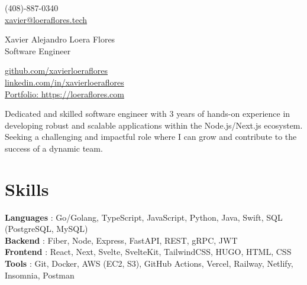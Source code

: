 \documentclass[a4,10pt]{article}
\newcommand{\hskills}[1]{
\textbf{\bfseries #1} }
\begin{document}
\begin{center}
    \begin{minipage}[b]{0.29\textwidth}
            (408)-887-0340 \\
            \href{mailto:xavier@loeraflores.tech}{xavier@loeraflores.tech} 
    \end{minipage}%
    \begin{minipage}[b]{0.4\textwidth}
            \centering
            {\Large Xavier Alejandro Loera Flores} \\ %
            \vspace{0.1cm}
            {\color{UI_blue} \Large{Software Engineer}} \\
    \end{minipage}%
    \begin{minipage}[b]{0.29\textwidth}
            \flushright  %
            {\href{https://github.com/xavierloeraflores}{github.com/xavierloeraflores} } \\
            {\href{https://www.linkedin.com/in/xavierloeraflores}{linkedin.com/in/xavierloeraflores} } \\
            \href{https://loeraflores.com}{Portfolio: https://loeraflores.com}
    \end{minipage}   
    
\vspace{-0.15cm} 
{\color{UI_blue} \hrulefill}
\end{center}
\vspace{-0.25cm}

{Dedicated and skilled software engineer with 3 years of hands-on experience in developing robust and scalable applications within the Node.js/Next.js ecosystem. Seeking a challenging and impactful role where I can grow and contribute to the success of a dynamic team.}
\vspace{-0.4cm}

\section{Skills}
\hskills{Languages}: {Go/Golang, TypeScript, JavaScript, Python,  Java, Swift, SQL (PostgreSQL, MySQL)}  \\
\hskills{Backend}: {Fiber, Node, Express, FastAPI, REST, gRPC, JWT }  \\
\hskills{Frontend}: {React, Next, Svelte, SvelteKit, TailwindCSS, HUGO, HTML, CSS} \\
\hskills{Tools}: {Git, Docker, AWS (EC2, S3), GitHub Actions, Vercel, Railway, Netlify, Insomnia, Postman} \\
\vspace{-0.2cm}
\end{document}
